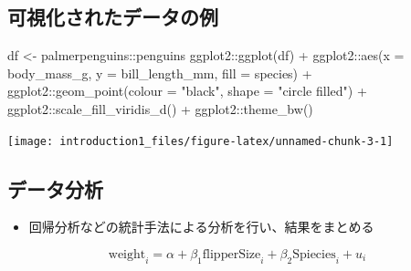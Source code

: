 \documentclass[
]{ltjsarticle}
\newenvironment{Shaded}{\begin{snugshade}}{\end{snugshade}}
\newcommand{\AttributeTok}[1]{\textcolor[rgb]{0.77,0.63,0.00}{#1}}
\newcommand{\FunctionTok}[1]{\textcolor[rgb]{0.00,0.00,0.00}{#1}}
\newcommand{\NormalTok}[1]{#1}
\newcommand{\OtherTok}[1]{\textcolor[rgb]{0.56,0.35,0.01}{#1}}
\newcommand{\SpecialCharTok}[1]{\textcolor[rgb]{0.00,0.00,0.00}{#1}}
\newcommand{\StringTok}[1]{\textcolor[rgb]{0.31,0.60,0.02}{#1}}
\providecommand{\tightlist}{%
  \setlength{\itemsep}{0pt}\setlength{\parskip}{0pt}}
\begin{document}
\hypertarget{ux53efux8996ux5316ux3055ux308cux305fux30c7ux30fcux30bfux306eux4f8b}{%
\subsection{可視化されたデータの例}\label{ux53efux8996ux5316ux3055ux308cux305fux30c7ux30fcux30bfux306eux4f8b}}

\begin{Shaded}
\begin{Highlighting}[]
\NormalTok{df }\OtherTok{\textless{}{-}}\NormalTok{ palmerpenguins}\SpecialCharTok{::}\NormalTok{penguins}
\NormalTok{ggplot2}\SpecialCharTok{::}\FunctionTok{ggplot}\NormalTok{(df) }\SpecialCharTok{+}
\NormalTok{  ggplot2}\SpecialCharTok{::}\FunctionTok{aes}\NormalTok{(}\AttributeTok{x =}\NormalTok{ body\_mass\_g, }\AttributeTok{y =}\NormalTok{ bill\_length\_mm, }\AttributeTok{fill =}\NormalTok{ species) }\SpecialCharTok{+}
\NormalTok{  ggplot2}\SpecialCharTok{::}\FunctionTok{geom\_point}\NormalTok{(}\AttributeTok{colour =} \StringTok{"black"}\NormalTok{, }\AttributeTok{shape =} \StringTok{"circle filled"}\NormalTok{) }\SpecialCharTok{+}
\NormalTok{  ggplot2}\SpecialCharTok{::}\FunctionTok{scale\_fill\_viridis\_d}\NormalTok{() }\SpecialCharTok{+}
\NormalTok{  ggplot2}\SpecialCharTok{::}\FunctionTok{theme\_bw}\NormalTok{()}
\end{Highlighting}
\end{Shaded}

\begin{center}\texttt{[image: introduction1\_files/figure-latex/unnamed-chunk-3-1]} \end{center}

\hypertarget{ux30c7ux30fcux30bfux5206ux6790}{%
\subsection{データ分析}\label{ux30c7ux30fcux30bfux5206ux6790}}

\begin{itemize}
\tightlist
\item
  回帰分析などの統計手法による分析を行い、結果をまとめる
\end{itemize}

\[\text{weight}_{i} = \alpha + \beta_1\text{flipperSize}_i + \beta_2 \text{Spiecies}_i + u_i\]
\end{document}
